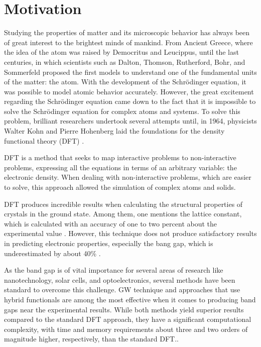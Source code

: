 \section{Motivation}
Studying the properties of matter  and its microscopic behavior has always been of great interest to the brightest minds of mankind. From Ancient Greece, where the idea of the atom was raised by Democritus and Leucippus, until the last centuries, in which scientists such as Dalton, Thomson, Rutherford, Bohr, and Sommerfeld proposed the first models to understand one of the fundamental units of the matter: the atom. With the development of the Schrödinger equation, it was possible to model atomic behavior accurately. However, the great excitement regarding the Schrödinger equation came down to the fact that it is impossible to solve the Schrödinger equation for complex atoms and systems. To solve this problem, brilliant researchers undertook several attempts until, in 1964, physicists Walter Kohn and Pierre Hohenberg laid the foundations for the density functional theory (DFT) \cite{PhysRev.136.B864}.

\medskip

DFT is a method that seeks to map interactive problems to non-interactive problems, expressing all the equations in terms of an arbitrary variable: the electronic density. When dealing with non-interactive problems, which are easier to solve, this approach allowed the simulation of complex atoms and solids. \cite{burke2015abc}

\medskip

DFT produces incredible results when calculating the structural properties of crystals in the ground state. Among them, one mentions the lattice constant, which is calculated with an accuracy of one to two percent about the experimental value \cite{DFTCoursera} \cite{PhysRevB.79.085104}. However, this technique does not produce satisfactory results in predicting electronic properties, especially the bang gap, which is underestimated by about 40\% \cite{PhysRevLett.51.1884}.


\medskip 

As the band gap is of vital importance for several areas of research like nanotechnology, solar cells, and optoelectronics, several methods have been standard to overcome this challenge. GW \cite{RevModPhys.74.601} technique and approaches that use hybrid functionals are among the most effective when it comes to producing band gaps near the experimental results. While both methods yield superior results compared to the standard DFT approach, they have a significant computational complexity, with time and memory requirements about three and two orders of magnitude higher, respectively, than the standard DFT.\cite{Pela_2015}.

